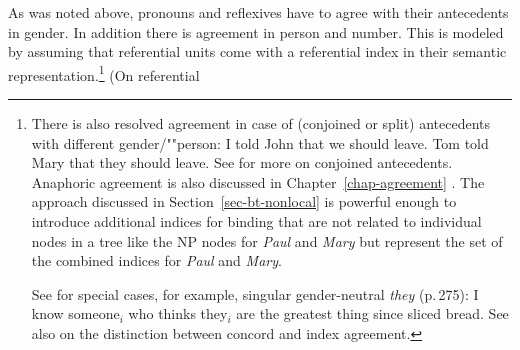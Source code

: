 \documentclass[output=paper,biblatex,babelshorthands,newtxmath,draftmode,colorlinks,citecolor=brown]{langscibook}
\begin{document}
As was noted above,  pronouns and reflexives have to agree with their antecedents in
gender.
In addition there is agreement in person and number. This is modeled by assuming that
referential units come with a referential index in their semantic representation.\footnote{
 There is also resolved agreement in case of (conjoined or split) antecedents with different
 gender/""person:
\eal
\ex I told John that we should leave.
\ex Tom told Mary that they should leave. \citep[]{Bresnan82c}
\zl
See 
for more on conjoined antecedents. Anaphoric agreement is also discussed in Chapter~\ref{chap-agreement}
\citep[Section~\ref{agreement:sec-anaphotic-agreement}]{chapters/agreement}. The approach discussed in
Section~\ref{sec-bt-nonlocal} is powerful enough to 
introduce additional indices for binding that are not related to individual nodes in a tree like the
NP nodes for \emph{Paul} and \emph{Mary} but represent the set of the combined indices for \emph{Paul} and
\emph{Mary}.

See  for special cases, for example, singular
    gender-neutral \emph{they} (p.\,275):
\ea
I know someone$_i$ who thinks they$_i$ are the greatest thing since sliced bread.
\z
See also  on the distinction between concord and index agreement.
} (On referential
\end{document}
